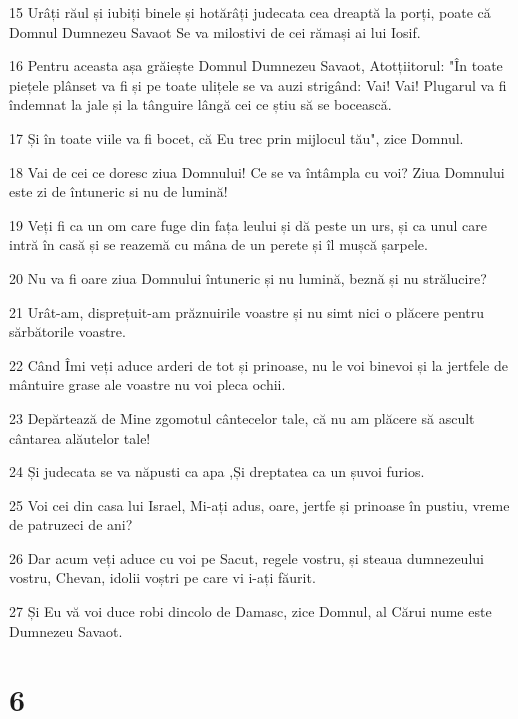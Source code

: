 \par 15 Urâți răul și iubiți binele și hotărâți judecata cea dreaptă la porți, poate că Domnul Dumnezeu Savaot Se va milostivi de cei rămași ai lui Iosif.
\par 16 Pentru aceasta așa grăiește Domnul Dumnezeu Savaot, Atotțiitorul: "În toate piețele plânset va fi și pe toate ulițele se va auzi strigând: Vai! Vai! Plugarul va fi îndemnat la jale și la tânguire lângă cei ce știu să se bocească.
\par 17 Și în toate viile va fi bocet, că Eu trec prin mijlocul tău", zice Domnul.
\par 18 Vai de cei ce doresc ziua Domnului! Ce se va întâmpla cu voi? Ziua Domnului este zi de întuneric si nu de lumină!
\par 19 Veți fi ca un om care fuge din fața leului și dă peste un urs, și ca unul care intră în casă și se reazemă cu mâna de un perete și îl mușcă șarpele.
\par 20 Nu va fi oare ziua Domnului întuneric și nu lumină, beznă și nu strălucire?
\par 21 Urât-am, disprețuit-am prăznuirile voastre și nu simt nici o plăcere pentru sărbătorile voastre.
\par 22 Când Îmi veți aduce arderi de tot și prinoase, nu le voi binevoi și la jertfele de mântuire grase ale voastre nu voi pleca ochii.
\par 23 Depărtează de Mine zgomotul cântecelor tale, că nu am plăcere să ascult cântarea alăutelor tale!
\par 24 Și judecata se va năpusti ca apa ,Și dreptatea ca un șuvoi furios.
\par 25 Voi cei din casa lui Israel, Mi-ați adus, oare, jertfe și prinoase în pustiu, vreme de patruzeci de ani?
\par 26 Dar acum veți aduce cu voi pe Sacut, regele vostru, și steaua dumnezeului vostru, Chevan, idolii voștri pe care vi i-ați făurit.
\par 27 Și Eu vă voi duce robi dincolo de Damasc, zice Domnul, al Cărui nume este Dumnezeu Savaot.

\chapter{6}

